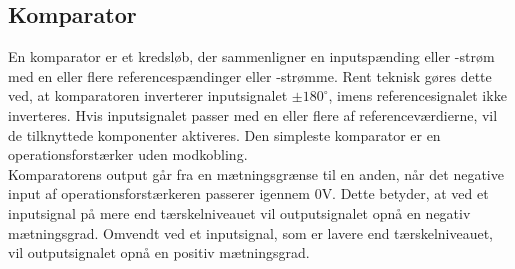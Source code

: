 \subsection{Komparator}\label{Komparatorafsnit}
En komparator er et kredsløb, der sammenligner en inputspænding eller -strøm med en eller flere referencespændinger eller -strømme. Rent teknisk gøres dette ved, at komparatoren inverterer inputsignalet $\pm180^{\circ}$, imens referencesignalet ikke inverteres. Hvis inputsignalet passer med en eller flere af referenceværdierne, vil de tilknyttede komponenter aktiveres. Den simpleste komparator er en operationsforstærker uden modkobling. \cite{webster2009} \\
Komparatorens output går fra en mætningsgrænse til en anden, når det negative input af operationsforstærkeren passerer igennem $0$V. Dette betyder, at ved et inputsignal på mere end tærskelniveauet vil outputsignalet opnå en negativ mætningsgrad. Omvendt ved et inputsignal, som er lavere end tærskelniveauet, vil outputsignalet opnå en positiv mætningsgrad. \cite{webster2009} 

